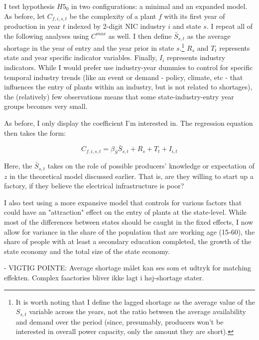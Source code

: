 \documentclass[11pt]{article}
\begin{document}
I test hypothesis $H5_0$ in two configurations: a minimal and an expanded model. As before, let $C_{f,i,s,t}$ be the complexity of a plant $f$ with its first year of production in year $t$ indexed by 2-digit NIC industry $i$ and state $s$. I repeat all of the following analyses using $C^{max}$ as well. I then define $\bar{S}_{s,t}$ as the average shortage in the year of entry and the year prior in state $s$.\footnote{It is worth noting that I define the lagged shortage as the average value of the $S_{s,t}$ variable across the years, not the ratio between the average availability and demand over the period (since, presumably, producers won't be interested in overall power capacity, only the amount they are short).} $R_{s}$ and $T_{t}$ represents state and year specific indicator variables. Finally, $I_{i}$ represents industry indicators. While I would prefer use industry-year dummies to control for specific temporal industry trends (like an event or demand - policy, climate, etc - that influences the entry of plants within an industry, but is not related to shortages), the (relatively) few observations means that some state-industry-entry year groups becomes very small. 

As before, I only display the coefficient I'm interested in. The regression equation then takes the form:

\begin{equation}
\label{eqn:entry}
C_{f,i,s,t} = \beta_{\bar{S}} \bar{S}_{s,t} + R_{s} + T_{t} + I_{i,t} 
\end{equation}

Here, the $\bar{S}_{s,t}$ takes on the role of possible producers' knowledge or expectation of $z$ in the theoretical model discussed earlier. That is, are they willing to start up a factory, if they believe the electrical infrastructure is poor?

I also test using a more expansive model that controls for various factors that could have an "attraction" effect on the entry of plants at the state-level. While most of the differences between states should be caught in the fixed effects, I now allow for variance in the share of the population that are working age (15-60), the share of people with at least a secondary education completed, the growth of the state economy and the total size of the state economy. 



- VIGTIG POINTE: Average shortage målet kan ses som et udtryk for matching effekten. Complex faactories bliver ikke lagt i høj-shortage stater.
\end{document}
